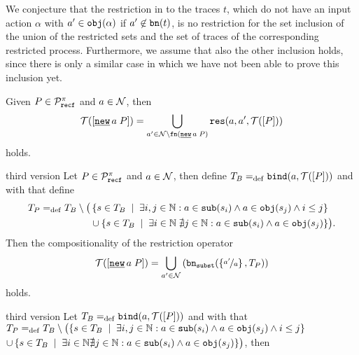 We conjecture that the restriction in  to the traces $t$, which do not have an input action $\alpha$ with $a'\in\mathtt{obj}(\alpha)$ if $a'\not\in\mathtt{bn}(t)$, is no restriction for the set inclusion of the union of the restricted sets and the set of traces of the corresponding restricted process. Furthermore, we assume that also the other inclusion holds, since there is only a similar case in which we have not been able to prove this inclusion yet. 

\begin{conject}
\label{conj_compositionality_traces_res}
	Given $P\in\mathcal P^{\pi}_{\mathtt{recf}}$ and $a\in\mathcal N$, then
	\[\traces[\procres{a}{P}]=\bigcup_{a'\in\names\setminus\fn{\procres{a}{P}}}\res{a}{a'}{P}\]
	holds.
	\begin{old}{third version}			
	Let $P\in\mathcal P^{\pi}_{\mathtt{recf}}$ and $a\in\mathcal N$, then define $T_B\define\bind{a}{\traces[P]}$ and with that define 
	\begin{align*}
		T_P\define{}T_B\setminus\bigl(&\left\{s\in{}T_B \; \mid \; \exists{}i,j\in\N:a\in\sub{s_i}\wedge{}a\in\obj{s_j}\wedge{}i\leq{}j\right\} \\
				&\cup \set[\exists{}i\in\N\;\nexists{}j\in\N:a\in\sub{s_i}\wedge{}a\in{}\obj{s_j}]{s\in{}T_B}\bigr).
	\end{align*}
	 Then the compositionality of the restriction operator
				\[\traces[\procres{a}{P}] = \bigcup_{a'\in\names}\left(\bnsubst{a'}{a}{T_P}\right)\]			
	holds.
	\end{old}
	\begin{old}{third version}			
		Let $T_B\define\bind{a}{\traces[P]}$ and with that \newline$T_P=_{\mathrm{def}}{}T_B\setminus\bigl(\left\{s\in{}T_B \; \mid \; \exists{}i,j\in\mathbb N:a\in\mathtt{sub}(s_i)\wedge{}a\in\mathtt{obj}(s_j)\wedge{}i\leq{}j\right\}$\newline{} $\cup \set[\exists{}i\in\N\nexists{}j\in\N:a\in\sub{s_i}\wedge{}a\in{}\obj{s_j}]{s\in{}T_B}\bigr)$, then

\end{old}
\end{conject}
